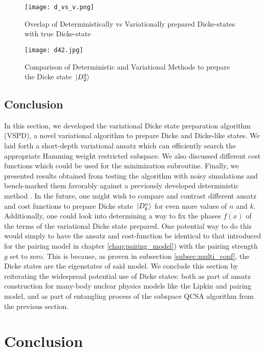 \documentclass[Dual]{msu-thesis}
\begin{document}
\begin{figure}
    \centering
    \texttt{[image: d\_vs\_v.png]}
    \caption{Overlap of Deterministically vs Variationally prepared Dicke-states with true Dicke-state}
    \label{fig:dicke_overlap}
\end{figure}

\begin{figure}
    \centering
    \texttt{[image: d42.jpg]}
    \caption{Comparison of Deterministic and Variational Methods to prepare the Dicke state $\ket*{D^4_2}$}
    \label{fig:dicke_comp}
\end{figure}

\section{Conclusion}

In this section, we developed the variational Dicke state preparation algorithm (VSPD), a novel variational algorithm to prepare Dicke and Dicke-like states. We laid forth a short-depth variational ansatz which can efficiently search the appropriate Hamming weight restricted subspace. We also discussed different cost functions which could be used for the minimization subroutine. Finally, we presented results obtained from testing the algorithm with noisy simulations and bench-marked them favorably against a previously developed deterministic method \cite{dick_prep}. In the future, one might wish to compare and contrast different ansatz and cost functions to prepare Dicke state $\ket*{D^n_k}$ for even more values of $n$ and $k$. Additionally, one could look into determining a way to fix the phases $f(x)$ of the terms of the variational Dicke state prepared. One potential way to do this would simply to have the ansatz and cost-function be identical to that introduced for the pairing model in chapter \ref{chap:pairing_model}) with the pairing strength $g$ set to zero. This is because, as proven in subsection \ref{subsec:multi_conf}, the Dicke states are the eigenstates of said model. We conclude this section by reiterating the widespread potential use of Dicke states: both as part of ansatz construction for many-body nuclear physics models like the Lipkin and pairing model, and as part of entangling process of the subspace QCSA algorithm from the previous section.

\chapter{Conclusion}
\end{document}
